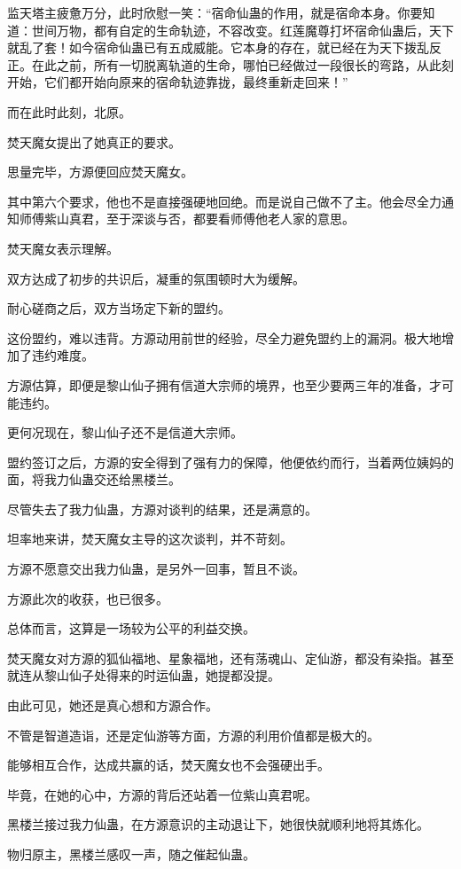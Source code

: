 \begin{this_body}
监天塔主疲惫万分，此时欣慰一笑：“宿命仙蛊的作用，就是宿命本身。你要知道：世间万物，都有自定的生命轨迹，不容改变。红莲魔尊打坏宿命仙蛊后，天下就乱了套！如今宿命仙蛊已有五成威能。它本身的存在，就已经在为天下拨乱反正。在此之前，所有一切脱离轨道的生命，哪怕已经做过一段很长的弯路，从此刻开始，它们都开始向原来的宿命轨迹靠拢，最终重新走回来！”

而在此时此刻，北原。

焚天魔女提出了她真正的要求。

思量完毕，方源便回应焚天魔女。

其中第六个要求，他也不是直接强硬地回绝。而是说自己做不了主。他会尽全力通知师傅紫山真君，至于深谈与否，都要看师傅他老人家的意思。

焚天魔女表示理解。

双方达成了初步的共识后，凝重的氛围顿时大为缓解。

耐心磋商之后，双方当场定下新的盟约。

这份盟约，难以违背。方源动用前世的经验，尽全力避免盟约上的漏洞。极大地增加了违约难度。

方源估算，即便是黎山仙子拥有信道大宗师的境界，也至少要两三年的准备，才可能违约。

更何况现在，黎山仙子还不是信道大宗师。

盟约签订之后，方源的安全得到了强有力的保障，他便依约而行，当着两位姨妈的面，将我力仙蛊交还给黑楼兰。

尽管失去了我力仙蛊，方源对谈判的结果，还是满意的。

坦率地来讲，焚天魔女主导的这次谈判，并不苛刻。

方源不愿意交出我力仙蛊，是另外一回事，暂且不谈。

方源此次的收获，也已很多。

总体而言，这算是一场较为公平的利益交换。

焚天魔女对方源的狐仙福地、星象福地，还有荡魂山、定仙游，都没有染指。甚至就连从黎山仙子处得来的时运仙蛊，她提都没提。

由此可见，她还是真心想和方源合作。

不管是智道造诣，还是定仙游等方面，方源的利用价值都是极大的。

能够相互合作，达成共赢的话，焚天魔女也不会强硬出手。

毕竟，在她的心中，方源的背后还站着一位紫山真君呢。

黑楼兰接过我力仙蛊，在方源意识的主动退让下，她很快就顺利地将其炼化。

物归原主，黑楼兰感叹一声，随之催起仙蛊。


\end{this_body}

